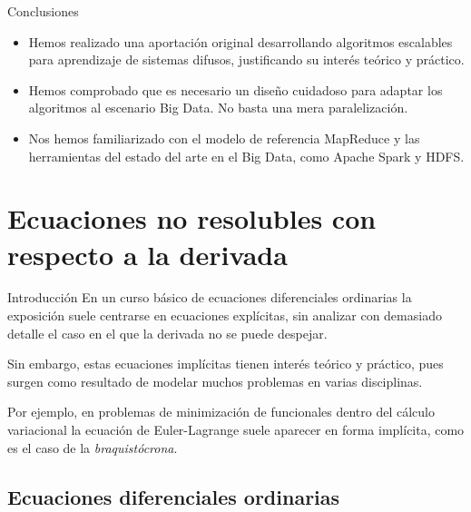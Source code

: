 \documentclass[10pt, spanish]{beamer}
\begin{document}
\begin{frame}{Conclusiones}
    \begin{itemize}
      \item Hemos realizado una aportación original desarrollando algoritmos escalables para aprendizaje de sistemas difusos, justificando su interés teórico y práctico.
      \item Hemos comprobado que es necesario un diseño cuidadoso para adaptar los algoritmos al escenario Big Data. No basta una mera paralelización.
      \item Nos hemos familiarizado con el modelo de referencia MapReduce y las herramientas del estado del arte en el Big Data, como Apache Spark y HDFS.
    \end{itemize}
\end{frame}

\section{Ecuaciones no resolubles con respecto a la derivada}


\begin{frame}{Introducción}
En un curso básico de ecuaciones diferenciales ordinarias la exposición suele centrarse en ecuaciones explícitas, sin analizar con demasiado detalle el caso en el que la derivada no se puede despejar.

Sin embargo, estas ecuaciones implícitas tienen interés teórico y práctico, pues surgen como resultado de modelar muchos problemas en varias disciplinas.

Por ejemplo, en problemas de minimización de funcionales dentro del cálculo variacional la ecuación de Euler-Lagrange suele aparecer en forma implícita, como es el caso de la \textit{braquistócrona}.
\end{frame}

\subsection{Ecuaciones diferenciales ordinarias}
\end{document}
